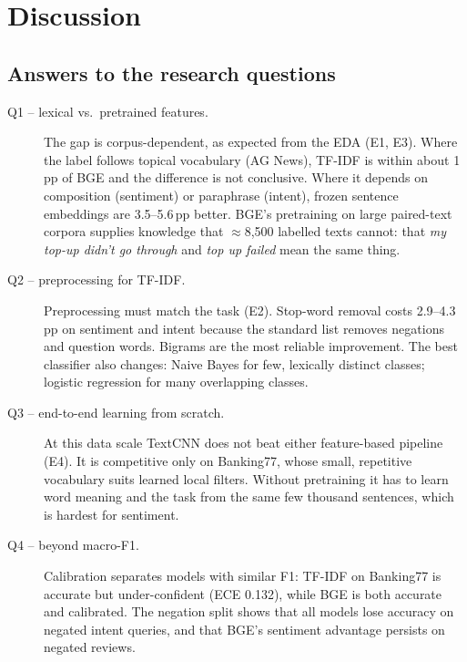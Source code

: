 \section{Discussion}
\label{sec:discussion}

\subsection{Answers to the research questions}
\begin{description}
  \item[Q1 -- lexical vs.\ pretrained features.] The gap is corpus-dependent, as expected from the EDA (E1, E3). Where the label follows topical vocabulary (AG News), TF-IDF is within about 1\,pp of BGE and the difference is not conclusive. Where it depends on composition (sentiment) or paraphrase (intent), frozen sentence embeddings are 3.5--5.6\,pp better. BGE's pretraining on large paired-text corpora supplies knowledge that ${\approx}$8{,}500 labelled texts cannot: that \textit{my top-up didn't go through} and \textit{top up failed} mean the same thing.
  \item[Q2 -- preprocessing for TF-IDF.] Preprocessing must match the task (E2). Stop-word removal costs 2.9--4.3\,pp on sentiment and intent because the standard list removes negations and question words. Bigrams are the most reliable improvement. The best classifier also changes: Naive Bayes for few, lexically distinct classes; logistic regression for many overlapping classes.
  \item[Q3 -- end-to-end learning from scratch.] At this data scale TextCNN does not beat either feature-based pipeline (E4). It is competitive only on Banking77, whose small, repetitive vocabulary suits learned local filters. Without pretraining it has to learn word meaning and the task from the same few thousand sentences, which is hardest for sentiment.
  \item[Q4 -- beyond macro-F1.] Calibration separates models with similar F1: TF-IDF on Banking77 is accurate but under-confident (ECE 0.132), while BGE is both accurate and calibrated. The negation split shows that all models lose accuracy on negated intent queries, and that BGE's sentiment advantage persists on negated reviews.
\end{description}

